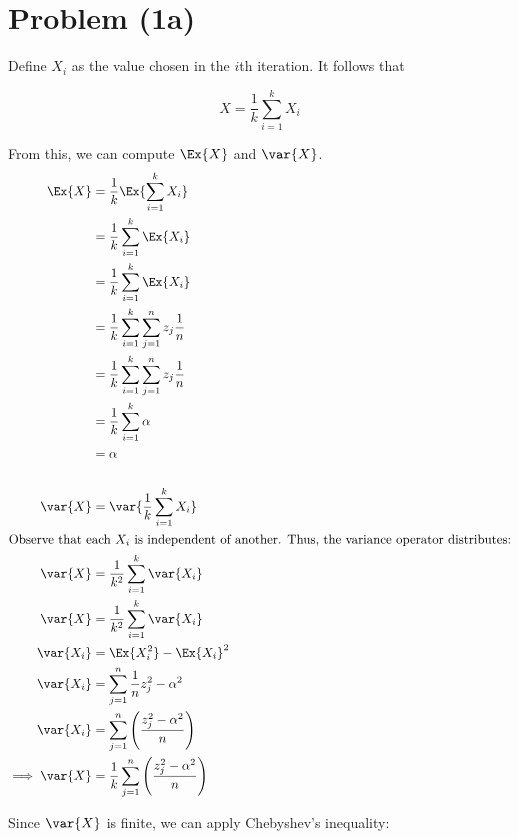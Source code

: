 \documentclass[../main.tex]{subfiles}
\begin{document}

\section*{Problem (1a)}


Define $X_{i}$ as the value chosen in the $i$th iteration. It follows that

\[
    X = \frac{1}{k}\sum_{i=1}^{k} X_{i}
\]

From this, we can compute $\Ex{X}$ and $\var{X}$.
\begin{align*}
    \Ex{X} &= \frac{1}{k} \Ex{\sum_{i=1}^{k} X_{i}} \\
    &= \frac{1}{k} \sum_{i=1}^{k} \Ex{X_{i}} \\
    &= \frac{1}{k} \sum_{i=1}^{k} \Ex{X_{i}} \\
    &= \frac{1}{k} \sum_{i=1}^{k} \sum_{j=1}^{n}z_{j} \frac{1}{n} \\
    &= \frac{1}{k} \sum_{i=1}^{k} \sum_{j=1}^{n}z_{j} \frac{1}{n} \\
    &= \frac{1}{k} \sum_{i=1}^{k} \alpha \\
    &= \alpha \\
    \\
    \var{X} &= \var{\frac{1}{k}\sum_{i=1}^{k} X_{i}} \\
    \intertext{Observe that each $X_{i}$ is independent of another. Thus, the variance
operator distributes:}
    \var{X} &= \frac{1}{k^2}\sum_{i=1}^{k} \var{X_{i}} \\
    \var{X} &= \frac{1}{k^2}\sum_{i=1}^{k} \var{X_{i}} \\
    \var{X_{i}} &= \Ex{X_{i}^2} - \Ex{X_{i}}^2 \\
    \var{X_{i}} &= \sum_{j=1}^{n}\frac{1}{n}z_{j}^2 - \alpha^2 \\
    \var{X_{i}} &= \sum_{j=1}^{n}\left(\frac{z_{j}^2 - \alpha^2}{n}\right) \\
    \implies \var{X} &= \frac{1}{k}\sum_{j=1}^{n} \left(\frac{z_{j}^2 - \alpha^2}{n}\right) \\
\end{align*}

Since $\var{X}$ is finite, we can apply Chebyshev's inequality:
\end{document}
